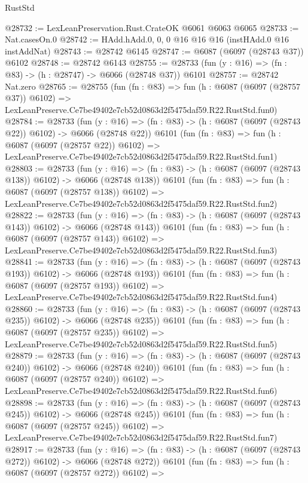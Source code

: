 \begin{lexlean}{RustStd}
\begin{coremodule}
@28732 := LexLeanPreservation.Rust.CrateOK @6061 @6063 @6065
@28733 := Nat.casesOn.{0}
@28742 := HAdd.hAdd.{0, 0, 0} @16 @16 @16 (instHAdd.{0} @16 instAddNat)
@28743 := @28742 @6145
@28747 := @6087 (@6097 (@28743 @37)) @6102
@28748 := @28742 @6143
@28755 := @28733 (fun (y : @16) => (fn : @83) -> (h : @28747) -> @6066 (@28748 @37)) @6101
@28757 := @28742 Nat.zero
@28765 := @28755
    (fun (fn : @83) =>
    fun (h : @6087 (@6097 (@28757 @37)) @6102) =>
    LexLeanPreserve.Ce7be49402e7cb52d0863d2f5475daf59.R22.RustStd.fun0)
@28784 := @28733
    (fun (y : @16) => (fn : @83) -> (h : @6087 (@6097 (@28743 @22)) @6102) -> @6066 (@28748 @22))
    @6101
    (fun (fn : @83) =>
    fun (h : @6087 (@6097 (@28757 @22)) @6102) =>
    LexLeanPreserve.Ce7be49402e7cb52d0863d2f5475daf59.R22.RustStd.fun1)
@28803 := @28733
    (fun (y : @16) => (fn : @83) -> (h : @6087 (@6097 (@28743 @138)) @6102) -> @6066 (@28748 @138))
    @6101
    (fun (fn : @83) =>
    fun (h : @6087 (@6097 (@28757 @138)) @6102) =>
    LexLeanPreserve.Ce7be49402e7cb52d0863d2f5475daf59.R22.RustStd.fun2)
@28822 := @28733
    (fun (y : @16) => (fn : @83) -> (h : @6087 (@6097 (@28743 @143)) @6102) -> @6066 (@28748 @143))
    @6101
    (fun (fn : @83) =>
    fun (h : @6087 (@6097 (@28757 @143)) @6102) =>
    LexLeanPreserve.Ce7be49402e7cb52d0863d2f5475daf59.R22.RustStd.fun3)
@28841 := @28733
    (fun (y : @16) => (fn : @83) -> (h : @6087 (@6097 (@28743 @193)) @6102) -> @6066 (@28748 @193))
    @6101
    (fun (fn : @83) =>
    fun (h : @6087 (@6097 (@28757 @193)) @6102) =>
    LexLeanPreserve.Ce7be49402e7cb52d0863d2f5475daf59.R22.RustStd.fun4)
@28860 := @28733
    (fun (y : @16) => (fn : @83) -> (h : @6087 (@6097 (@28743 @235)) @6102) -> @6066 (@28748 @235))
    @6101
    (fun (fn : @83) =>
    fun (h : @6087 (@6097 (@28757 @235)) @6102) =>
    LexLeanPreserve.Ce7be49402e7cb52d0863d2f5475daf59.R22.RustStd.fun5)
@28879 := @28733
    (fun (y : @16) => (fn : @83) -> (h : @6087 (@6097 (@28743 @240)) @6102) -> @6066 (@28748 @240))
    @6101
    (fun (fn : @83) =>
    fun (h : @6087 (@6097 (@28757 @240)) @6102) =>
    LexLeanPreserve.Ce7be49402e7cb52d0863d2f5475daf59.R22.RustStd.fun6)
@28898 := @28733
    (fun (y : @16) => (fn : @83) -> (h : @6087 (@6097 (@28743 @245)) @6102) -> @6066 (@28748 @245))
    @6101
    (fun (fn : @83) =>
    fun (h : @6087 (@6097 (@28757 @245)) @6102) =>
    LexLeanPreserve.Ce7be49402e7cb52d0863d2f5475daf59.R22.RustStd.fun7)
@28917 := @28733
    (fun (y : @16) => (fn : @83) -> (h : @6087 (@6097 (@28743 @272)) @6102) -> @6066 (@28748 @272))
    @6101
    (fun (fn : @83) =>
    fun (h : @6087 (@6097 (@28757 @272)) @6102) =>

\end{coremodule}
\end{lexlean}
